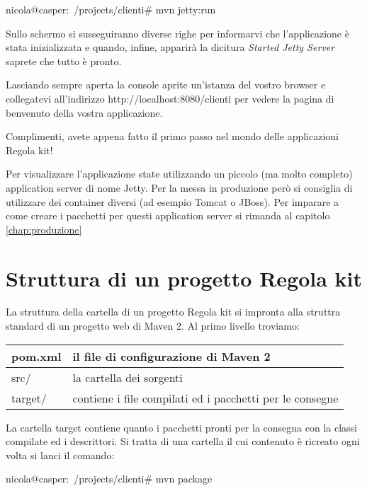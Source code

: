 \begin{bash}
nicola@casper:~/projects/clienti# mvn jetty:run
\end{bash}

Sullo schermo si susseguiranno diverse righe per informarvi che l'applicazione è stata inizializzata e quando, infine, apparirà la dicitura \emph{Started Jetty Server} saprete che tutto è pronto.

Lasciando sempre aperta la console aprite un'istanza del vostro browser e collegatevi all'indirizzo  {http://localhost:8080/clienti} per vedere la pagina di benvenuto della vostra applicazione.

Complimenti, avete appena fatto il primo passo nel mondo delle applicazioni Regola kit!

\begin{nota}
Per visualizzare l'applicazione state utilizzando un piccolo (ma molto completo) application server di nome Jetty. Per la messa in produzione però si consiglia di utilizzare dei container diversi (ad esempio Tomcat o JBoss). Per imparare a come creare i pacchetti per questi application server si rimanda al capitolo \vref{chap:produzione} 
\end{nota}

\section{Struttura di un progetto Regola kit}
La struttura della cartella di un progetto Regola kit si impronta alla struttra standard di un progetto web di Maven 2. Al primo livello troviamo:

\begin{center}
{
  \begin{tabular}{ | l | p{9cm} | }
  \hline
  pom.xml & il file di configurazione di Maven 2 \\ \hline
  src/ & la cartella dei sorgenti  \\ \hline
  target/ & contiene i file compilati ed i pacchetti per le consegne \\ \hline
  \end{tabular}
}
\end{center}

La cartella target contiene quanto i pacchetti pronti per la consegna con la classi compilate ed i descrittori. Si tratta di una cartella il cui contenuto è ricreato ogni volta si lanci il comando:

\begin{bash}
nicola@casper:~/projects/clienti# mvn package
\end{bash}

